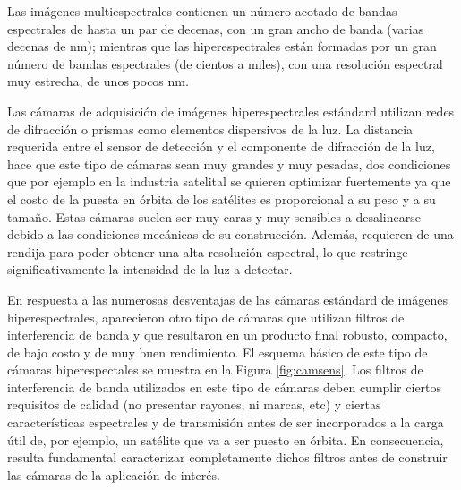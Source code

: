 \documentclass{ctuthesis}
\begin{document}
Las imágenes multiespectrales contienen un número acotado de bandas espectrales 
de hasta un par de decenas, con un gran ancho de banda (varias decenas de nm); 
mientras que las hiperespectrales están formadas por un gran número de bandas 
espectrales (de cientos a miles), con una resolución espectral muy estrecha, de 
unos pocos nm.

Las cámaras de adquisición de imágenes hiperespectrales estándard utilizan 
redes de difracción o prismas como elementos dispersivos de la luz. La 
distancia requerida entre el sensor de detección y  el componente de difracción 
de la luz, 
hace que este tipo de cámaras sean muy grandes y muy pesadas, dos condiciones 
que por ejemplo en la industria satelital se quieren optimizar fuertemente ya 
que el costo de la puesta en órbita de los satélites es proporcional a su peso 
y a su tamaño. 
Estas cámaras suelen ser muy caras y muy sensibles a desalinearse 
debido a las 
condiciones mecánicas de su construcción. Además, requieren de una rendija 
para poder obtener una alta resolución espectral, lo que restringe 
significativamente la intensidad de la luz a detectar.

En respuesta a las numerosas desventajas de las cámaras estándard de imágenes 
hiperespectrales, aparecieron otro tipo de cámaras que utilizan filtros de 
interferencia de banda y que resultaron en un producto final robusto, compacto, 
de bajo costo y de muy buen rendimiento. El esquema básico de este tipo de 
cámaras hiperespectales se muestra 
en la Figura \ref{fig:camsens}. Los filtros de interferencia de banda 
utilizados en este tipo de cámaras deben cumplir ciertos requisitos de calidad 
(no presentar rayones, ni marcas, etc) 
y ciertas características espectrales y de transmisión antes de ser 
incorporados a la carga útil de, por ejemplo, un satélite que va a ser puesto 
en 
órbita. En consecuencia, resulta fundamental caracterizar completamente dichos 
filtros antes de construir las cámaras de la aplicación de interés.
\end{document}

